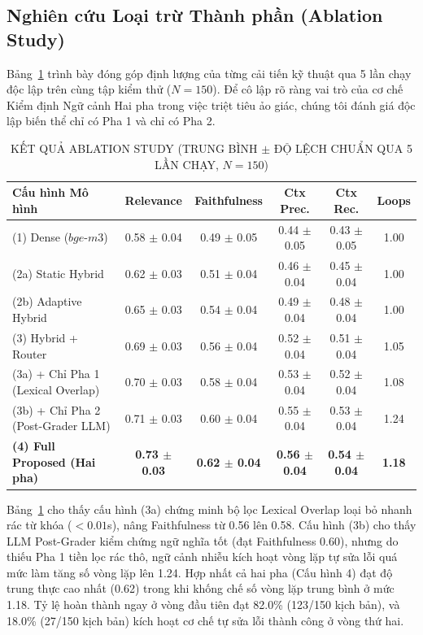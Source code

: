 \documentclass[conference]{IEEEtran}
\begin{document}
\subsection{Nghiên cứu Loại trừ Thành phần (Ablation Study)}
Bảng~\ref{tab2} trình bày đóng góp định lượng của từng cải tiến kỹ thuật qua 5 lần chạy độc lập trên cùng tập kiểm thử ($N = 150$). Để cô lập rõ ràng vai trò của cơ chế Kiểm định Ngữ cảnh Hai pha trong việc triệt tiêu ảo giác, chúng tôi đánh giá độc lập biến thể chỉ có Pha 1 và chỉ có Pha 2.

\begin{table}[!htbp]
\centering
\scriptsize
\setlength{\tabcolsep}{1.8pt}
\caption{KẾT QUẢ ABLATION STUDY (TRUNG BÌNH $\pm$ ĐỘ LỆCH CHUẨN QUA 5 LẦN CHẠY, $N=150$)}
\label{tab2}
\begin{tabular}{lccccc}
\toprule
\textbf{Cấu hình Mô hình} & \textbf{Relevance} & \textbf{Faithfulness} & \textbf{Ctx Prec.} & \textbf{Ctx Rec.} & \textbf{Loops} \\
\midrule
(1) Dense ($bge\text{-}m3$) & 0.58 $\pm$ 0.04 & 0.49 $\pm$ 0.05 & 0.44 $\pm$ 0.05 & 0.43 $\pm$ 0.05 & 1.00 \\
(2a) Static Hybrid & 0.62 $\pm$ 0.03 & 0.51 $\pm$ 0.04 & 0.46 $\pm$ 0.04 & 0.45 $\pm$ 0.04 & 1.00 \\
(2b) Adaptive Hybrid & 0.65 $\pm$ 0.03 & 0.54 $\pm$ 0.04 & 0.49 $\pm$ 0.04 & 0.48 $\pm$ 0.04 & 1.00 \\
(3) Hybrid + Router & 0.69 $\pm$ 0.03 & 0.56 $\pm$ 0.04 & 0.52 $\pm$ 0.04 & 0.51 $\pm$ 0.04 & 1.05 \\
(3a) + Chỉ Pha 1 (Lexical Overlap) & 0.70 $\pm$ 0.03 & 0.58 $\pm$ 0.04 & 0.53 $\pm$ 0.04 & 0.52 $\pm$ 0.04 & 1.08 \\
(3b) + Chỉ Pha 2 (Post-Grader LLM) & 0.71 $\pm$ 0.03 & 0.60 $\pm$ 0.04 & 0.55 $\pm$ 0.04 & 0.53 $\pm$ 0.04 & 1.24 \\
\textbf{(4) Full Proposed (Hai pha)} & \textbf{0.73 $\pm$ 0.03} & \textbf{0.62 $\pm$ 0.04} & \textbf{0.56 $\pm$ 0.04} & \textbf{0.54 $\pm$ 0.04} & \textbf{1.18} \\
\bottomrule
\end{tabular}
\end{table}

Bảng~\ref{tab2} cho thấy cấu hình (3a) chứng minh bộ lọc Lexical Overlap loại bỏ nhanh rác từ khóa ($<0.01$s), nâng Faithfulness từ 0.56 lên 0.58. Cấu hình (3b) cho thấy LLM Post-Grader kiểm chứng ngữ nghĩa tốt (đạt Faithfulness 0.60), nhưng do thiếu Pha 1 tiền lọc rác thô, ngữ cảnh nhiễu kích hoạt vòng lặp tự sửa lỗi quá mức làm tăng số vòng lặp lên 1.24. Hợp nhất cả hai pha (Cấu hình 4) đạt độ trung thực cao nhất (0.62) trong khi khống chế số vòng lặp trung bình ở mức 1.18. Tỷ lệ hoàn thành ngay ở vòng đầu tiên đạt 82.0\% (123/150 kịch bản), và 18.0\% (27/150 kịch bản) kích hoạt cơ chế tự sửa lỗi thành công ở vòng thứ hai.
\end{document}
